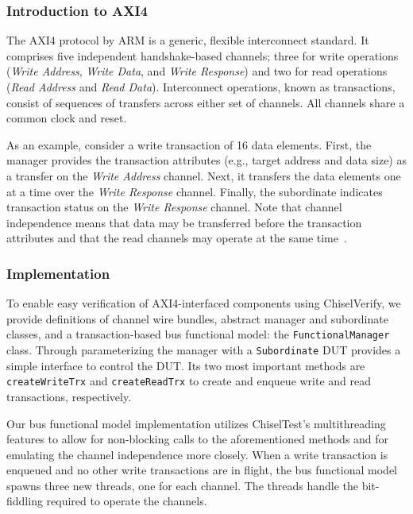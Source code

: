 \documentclass[conference]{IEEEtran}
\begin{document}
\subsubsection{Introduction to AXI4}
The AXI4 protocol by ARM is a generic, flexible interconnect standard. It comprises five independent handshake-based channels; three for write operations (\textit{Write Address}, \textit{Write Data}, and \textit{Write Response}) and two for read operations (\textit{Read Address} and \textit{Read Data}). Interconnect operations, known as transactions, consist of sequences of transfers across either set of channels. All channels share a common clock and reset.

As an example, consider a write transaction of 16 data elements. First, the manager provides the transaction attributes (e.g., target address and data size) as a transfer on the \textit{Write Address} channel. Next, it transfers the data elements one at a time over the \textit{Write Response} channel. Finally, the subordinate indicates transaction status on the \textit{Write Response} channel. Note that channel independence means that data may be transferred before the transaction attributes and that the read channels may operate at the same time~\cite{axi4standard}.

\subsubsection{Implementation}
To enable easy verification of AXI4-interfaced components using ChiselVerify, we provide definitions of channel wire bundles, abstract manager and subordinate classes, and a transaction-based bus functional model: the \texttt{FunctionalManager} class. Through parameterizing the manager with a \texttt{Subordinate} DUT provides a simple interface to control the DUT. Its two most important methods are \texttt{createWriteTrx} and \texttt{createReadTrx} to create and enqueue write and read transactions, respectively.

Our bus functional model implementation utilizes ChiselTest's multithreading features to allow for non-blocking calls to the aforementioned methods and for emulating the channel independence more closely. When a write transaction is enqueued and no other write transactions are in flight, the bus functional model spawns three new threads, one for each channel. The threads handle the bit-fiddling required to operate the channels.
\end{document}

